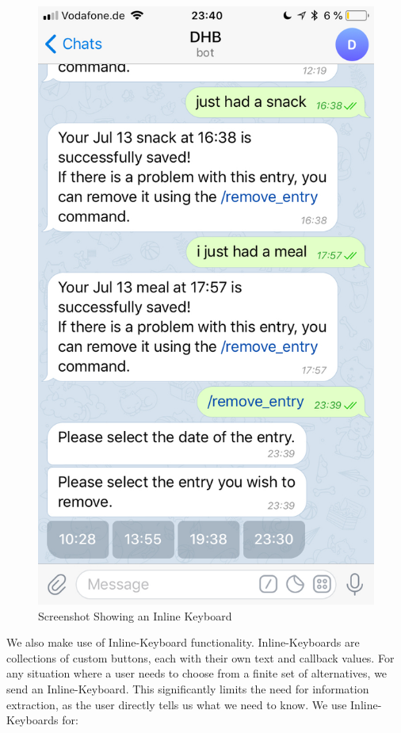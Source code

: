 \begin{figure}[htbp]
\begin{minipage}{.5\textwidth}
	\includegraphics[scale=0.2]{figures/keyboard}
        \caption{Screenshot Showing an Inline Keyboard}
	\label{fig:keyboard}
\end{minipage}
\end{figure}

We also make use of Inline-Keyboard functionality. 
Inline-Keyboards are collections of custom buttons, each with their own text and callback values.
For any situation where a user needs to choose from a finite set of alternatives, we send an Inline-Keyboard.
This significantly limits the need for information extraction, as the user directly tells us what we need to know.
We use Inline-Keyboards for:

